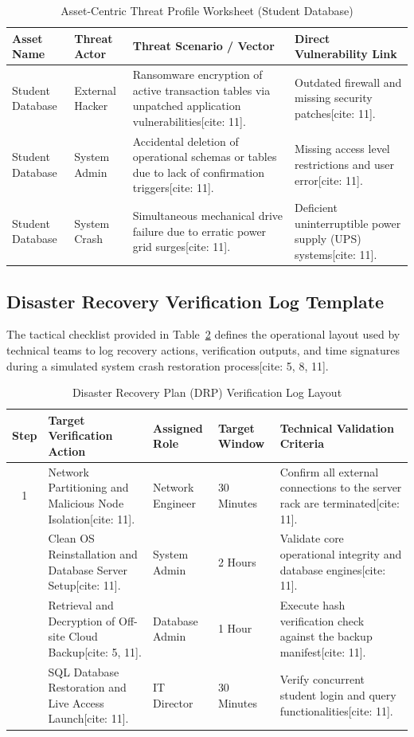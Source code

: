 \documentclass[journal,onecolumn,12pt,twoside]{IEEEtran}
\begin{document}
	\begin{table}[htbp]
		\caption{Asset-Centric Threat Profile Worksheet (Student Database)}
		\label{tab:app_threat_worksheet}
		\centering
		\begin{tabular}{ll p{5cm} l}
			\toprule
			\textbf{Asset Name} & \textbf{Threat Actor} & \textbf{Threat Scenario / Vector} & \textbf{Direct Vulnerability Link} \\
			\midrule
			Student Database & External Hacker & Ransomware encryption of active transaction tables via unpatched application vulnerabilities[cite: 11]. & Outdated firewall and missing security patches[cite: 11]. \\
			\addlinespace
			Student Database & System Admin & Accidental deletion of operational schemas or tables due to lack of confirmation triggers[cite: 11]. & Missing access level restrictions and user error[cite: 11]. \\
			\addlinespace
			Student Database & System Crash & Simultaneous mechanical drive failure due to erratic power grid surges[cite: 11]. & Deficient uninterruptible power supply (UPS) systems[cite: 11]. \\
			\bottomrule
		\end{tabular}
	\end{table}
	
	\subsection{Disaster Recovery Verification Log Template}
	The tactical checklist provided in Table~\ref{tab:app_drp_log} defines the operational layout used by technical teams to log recovery actions, verification outputs, and time signatures during a simulated system crash restoration process[cite: 5, 8, 11].
	
	\begin{table}[htbp]
		\caption{Disaster Recovery Plan (DRP) Verification Log Layout}
		\label{tab:app_drp_log}
		\centering
		\begin{tabular}{c p{4cm} ll p{3.5cm}}
			\toprule
			\textbf{Step} & \textbf{Target Verification Action} & \textbf{Assigned Role} & \textbf{Target Window} & \textbf{Technical Validation Criteria} \\
			\midrule
			1 & Network Partitioning and Malicious Node Isolation[cite: 11]. & Network Engineer & 30 Minutes & Confirm all external connections to the server rack are terminated[cite: 11]. \\
			\addlinespace
			2 & Clean OS Reinstallation and Database Server Setup[cite: 11]. & System Admin & 2 Hours & Validate core operational integrity and database engines[cite: 11]. \\
			\addlinespace
			3 & Retrieval and Decryption of Off-site Cloud Backup[cite: 5, 11]. & Database Admin & 1 Hour & Execute hash verification check against the backup manifest[cite: 11]. \\
			\addlinespace
			4 & SQL Database Restoration and Live Access Launch[cite: 11]. & IT Director & 30 Minutes & Verify concurrent student login and query functionalities[cite: 11]. \\
			\bottomrule
		\end{tabular}
	\end{table}
	
\end{document}

